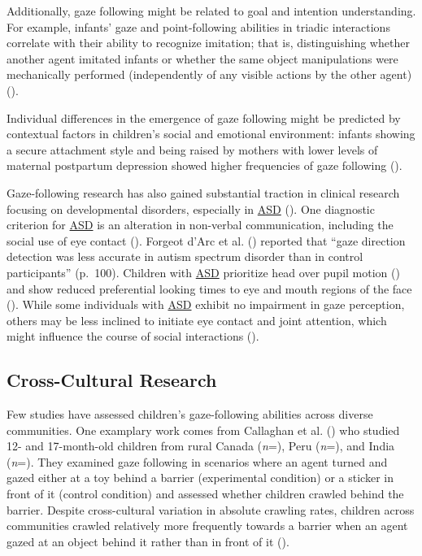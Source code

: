 \documentclass[
]{scrbook}
\begin{document}
Additionally, gaze following might be related to goal and intention understanding. For example, infants' gaze and point-following abilities in triadic interactions correlate with their ability to recognize imitation; that is, distinguishing whether another agent imitated infants or whether the same object manipulations were mechanically performed (independently of any visible actions by the other agent) ().

Individual differences in the emergence of gaze following might be predicted by contextual factors in children's social and emotional environment: infants showing a secure attachment style and being raised by mothers with lower levels of maternal postpartum depression showed higher frequencies of gaze following ().

Gaze-following research has also gained substantial traction in clinical research focusing on developmental disorders, especially in \hyperref[acronyms_ASD]{ASD} (). One diagnostic criterion for \hyperref[acronyms_ASD]{ASD} is an alteration in non-verbal communication, including the social use of eye contact (). Forgeot d'Arc et al. () reported that ``gaze direction detection was less accurate in autism spectrum disorder than in control participants'' (p.~100). Children with \hyperref[acronyms_ASD]{ASD} prioritize head over pupil motion () and show reduced preferential looking times to eye and mouth regions of the face (). While some individuals with \hyperref[acronyms_ASD]{ASD} exhibit no impairment in gaze perception, others may be less inclined to initiate eye contact and joint attention, which might influence the course of social interactions ().

\subsection{Cross-Cultural Research}\label{intro-gaze-cc}

Few studies have assessed children's gaze-following abilities across diverse communities. One examplary work comes from Callaghan et al. () who studied 12- and 17-month-old children from rural Canada (\emph{n}\thinspace =), Peru (\emph{n}\thinspace =), and India (\emph{n}\thinspace =). They examined gaze following in scenarios where an agent turned and gazed either at a toy behind a barrier (experimental condition) or a sticker in front of it (control condition) and assessed whether children crawled behind the barrier. Despite cross-cultural variation in absolute crawling rates, children across communities crawled relatively more frequently towards a barrier when an agent gazed at an object behind it rather than in front of it ().
\end{document}
